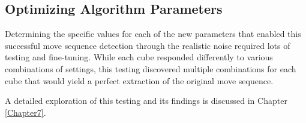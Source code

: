 \subsection{Optimizing Algorithm Parameters}
\label{subsec:optimizing-params}
Determining the specific values for each of the new parameters that enabled this successful move sequence detection through the realistic noise required lots of testing and fine-tuning.
While each cube responded differently to various combinations of settings, this testing discovered multiple combinations for each cube that would yield a perfect extraction of the original move sequence.

A detailed exploration of this testing and its findings is discussed in Chapter \ref{Chapter7}.
